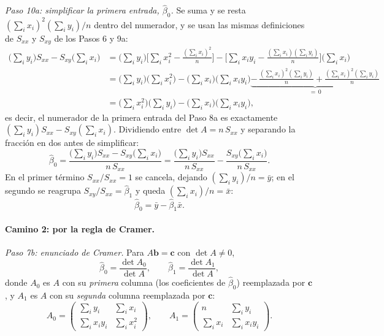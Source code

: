 \documentclass[11pt,a4paper,oneside]{article}
\theoremstyle{plain}
\theoremstyle{definition}
\begin{document}
\emph{Paso 10a: simplificar la primera entrada, $\hat\beta_0$.} Se suma
y se resta $(\sum_ix_i)^2(\sum_iy_i)/n$ dentro del numerador, y se usan
las mismas definiciones de $S_{xx}$ y $S_{xy}$ de los Pasos 6 y 9a:
\begin{align*}
  \Big(\sum_iy_i\Big)S_{xx} - S_{xy}\Big(\sum_ix_i\Big)
  &= \Big(\sum_iy_i\Big)\Big[\sum_ix_i^2-\frac{(\sum_ix_i)^2}{n}\Big]
   - \Big[\sum_ix_iy_i-\frac{(\sum_ix_i)(\sum_iy_i)}{n}\Big]\Big(\sum_ix_i\Big) \\
  &= \Big(\sum_iy_i\Big)\Big(\sum_ix_i^2\Big) - \Big(\sum_ix_i\Big)\Big(\sum_ix_iy_i\Big)
   \underbrace{-\,\frac{(\sum_ix_i)^2(\sum_iy_i)}{n}+\frac{(\sum_ix_i)^2(\sum_iy_i)}{n}}_{=\,0} \\
  &= \Big(\sum_ix_i^2\Big)\Big(\sum_iy_i\Big)-\Big(\sum_ix_i\Big)\Big(\sum_ix_iy_i\Big),
\end{align*}
es decir, el numerador de la primera entrada del Paso 8a es exactamente
$(\sum_iy_i)S_{xx}-S_{xy}(\sum_ix_i)$. Dividiendo entre $\det A=n\,S_{xx}$
y separando la fracción en dos antes de simplificar:
\[
  \hat\beta_0=\frac{\big(\sum_iy_i\big)S_{xx}-S_{xy}\big(\sum_ix_i\big)}{n\,S_{xx}}
  =\frac{\big(\sum_iy_i\big)S_{xx}}{n\,S_{xx}}-\frac{S_{xy}\big(\sum_ix_i\big)}{n\,S_{xx}} .
\]
En el primer término $S_{xx}/S_{xx}=1$ se cancela, dejando
$(\sum_iy_i)/n=\bar y$; en el segundo se reagrupa
$S_{xy}/S_{xx}=\hat\beta_1$ y queda $(\sum_ix_i)/n=\bar x$:
\[
  \hat\beta_0 = \bar y-\hat\beta_1\bar x .
\]

\paragraph{Camino 2: por la regla de Cramer.}

\emph{Paso 7b: enunciado de Cramer.} Para $A\mathbf b=\mathbf c$ con
$\det A\neq0$,
\[
  \hat\beta_0=\frac{\det A_0}{\det A}, \qquad \hat\beta_1=\frac{\det A_1}{\det A},
\]
donde $A_0$ es $A$ con su \emph{primera} columna (los coeficientes de
$\hat\beta_0$) reemplazada por $\mathbf c$, y $A_1$ es $A$ con su
\emph{segunda} columna reemplazada por $\mathbf c$:
\[
  A_0=\begin{pmatrix}\displaystyle\sum_iy_i & \displaystyle\sum_ix_i \\[4pt]
  \displaystyle\sum_ix_iy_i & \displaystyle\sum_ix_i^2\end{pmatrix}, \qquad
  A_1=\begin{pmatrix} n & \displaystyle\sum_iy_i \\[4pt]
  \displaystyle\sum_ix_i & \displaystyle\sum_ix_iy_i\end{pmatrix}.
\]
\end{document}
